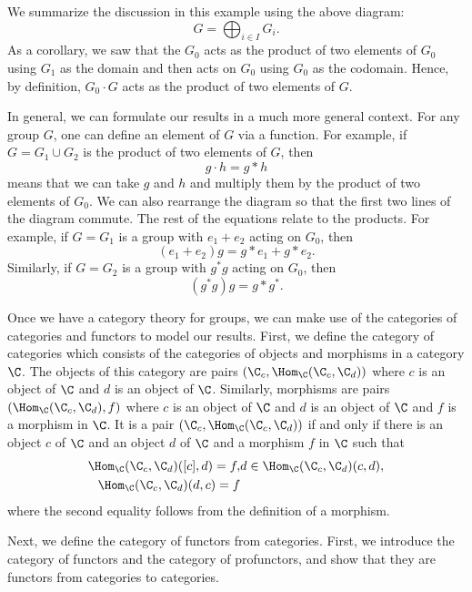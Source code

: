 \documentclass[a4paper,reqno,oneside]{article}
\begin{document}
{We summarize the discussion in this example using the above diagram: 
\[
G = \bigoplus_{i \in I} G_i.
\]
As a corollary, we saw that the $G_0$ acts as the product of two elements of $G_0$ using $G_1$ as the domain and then acts on $G_0$ using $G_0$ as the codomain.  Hence, by definition, $G_0 \cdot G$ acts as the product of two elements of $G$.  

In general, we can formulate our results in a much more general context. For any group $G$, one can define an element of $G$ via a function. For example, if $G = G_1 \cup G_2$ is the product of two elements of $G$, then 
\[
g \cdot h = g * h
\]
means that we can take $g$ and $h$ and multiply them by the product of two elements of $G_0$. We can also rearrange the diagram so that the first two lines of the diagram commute.  The rest of the equations relate to the products. For example, if $G = G_1$ is a group with $e_1 + e_2$ acting on $G_0$, then 
\[
(e_1 + e_2)g = g * e_1 + g * e_2.
\]
Similarly, if $G = G_2$ is a group with $g^*g$ acting on $G_0$, then 
\[
(g^*g)g = g * g^*.
\]

Once we have a category theory for groups, we can make use of the categories of categories and functors to model our results.  First, we define the category of categories which consists of the categories of objects and morphisms in a category $\C$. The objects of this category are pairs $(\C_c, \Hom_\C(\C_c, \C_d))$ where $c$ is an object of $\C$ and $d$ is an object of $\C$. Similarly, morphisms are pairs $(\Hom_\C(\C_c, \C_d), f)$ where $c$ is an object of $\C$ and $d$ is an object of $\C$ and $f$ is a morphism in $\C$. It is a pair $(\C_c, \Hom_\C(\C_c, \C_d))$ if and only if there is an object $c$ of $\C$ and an object $d$ of $\C$ and a morphism $f$ in $\C$ such that 
\begin{align*}
\Hom_{\C}(\C_c, \C_d)([c], d) = f, & d\in \Hom_{\C}(\C_c, \C_d)(c, d),\\
\Hom_{\C}(\C_c, \C_d)(d, c) = f
\end{align*}
where the second equality follows from the definition of a morphism. 

Next, we define the category of functors from categories. First, we introduce the category of functors and the category of profunctors, and show that they are functors from categories to categories. 

}
\end{document}
